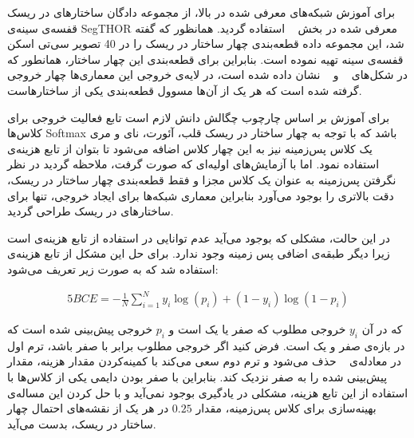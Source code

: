 برای آموزش شبکه‌های معرفی شده در بالا، از مجموعه دادگان ساختارهای در ریسک قفسه‌ی سینه‌ی SegTHOR معرفی شده در بخش ~ استفاده گردید. همانظور که گفته شد، این مجموعه داده قطعه‌بندی چهار ساختار در ریسک را در 40 تصویر سی‌تی اسکن قفسه‌ی سینه تهیه نموده است. بنابراین برای قطعه‌بندی این چهار ساختار، همانطور که در شکل‌های ~ و ~ نشان داده شده است، در لایه‌ی خروجی این معماری‌ها چهار خروجی گرفته شده است که هر یک از آن‌ها مسوول قطعه‌بندی یکی از ساختارهاست.

برای آموزش بر اساس چارچوب چگالش دانش لازم است تابع فعالیت خروجی برای کلاس‌ها Softmax باشد که با توجه به چهار ساختار در ریسک قلب، آئورت، نای و مری یک کلاس پس‌زمینه نیز به این چهار کلاس اضافه می‌شود تا بتوان از تابع هزینه‌ی  استفاده نمود. اما با آزمایش‌های اولیه‌ای که صورت گرفت، ملاحظه گردید در نظر نگرفتن پس‌زمینه به عنوان یک کلاس مجزا و فقط قطعه‌بندی چهار ساختار در ریسک، دقت بالاتری را بوجود می‌آورد بنابراین معماری شبکه‌ها برای ایجاد خروجی، تنها برای ساختارهای در ریسک طراحی گردید.

در این حالت، مشکلی که بوجود می‌آید عدم توانایی در استفاده از تابع هزینه‌ی  است زیرا دیگر طبقه‌ی اضافی پس زمینه وجود ندارد. برای حل این مشکل از تابع هزینه‌ی  استفاده شد که به صورت زیر تعریف می‌شود:

\begin{alignat}{5}
	BCE = -\frac{1}{N}\sum_{i=1}^N y_i \log(p_i)+(1-y_i)  \log(1-p_i)  \label{bce} 
\end{alignat}

که در آن $y_i$ خروجی مطلوب که صفر یا یک است و $p_i$ خروجی پیش‌بینی شده است که در بازه‌ی صفر و یک است. فرض کنید اگر خروجی مطلوب برابر با صفر باشد، ترم اول در معادله‌ی ~ حذف می‌شود و ترم دوم سعی می‌کند با کمینه‌کردن مقدار هزینه، مقدار پیش‌بینی شده را به صفر نزدیک کند. بنابراین با صفر بودن دایمی یکی از کلاس‌ها با استفاده از این تابع هزینه، مشکلی در یادگیری بوجود نمی‌آید و با حل کردن این مساله‌ی بهینه‌سازی برای کلاس پس‌زمینه، مقدار $0.25$ در هر یک از نقشه‌های احتمال چهار ساختار در ریسک، بدست می‌آید.



